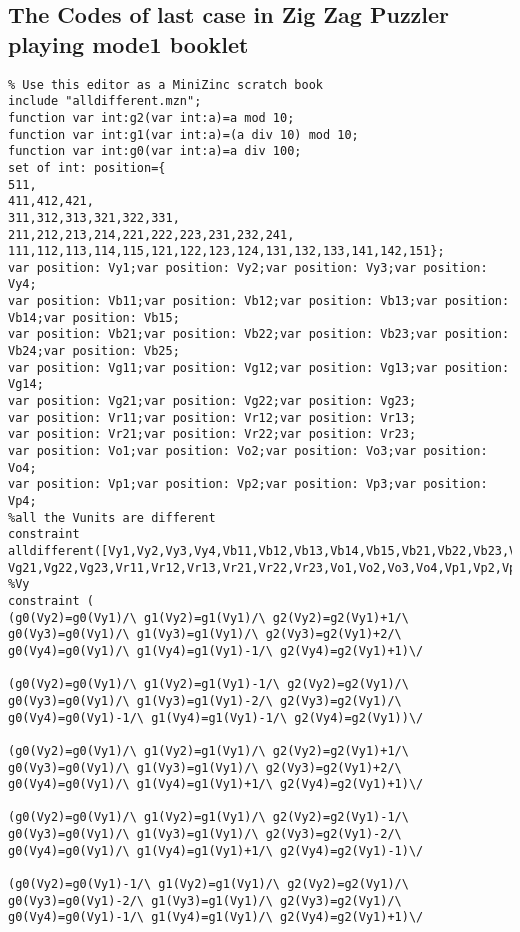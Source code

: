 \begin{appendices}
\section{The Codes of last case in Zig Zag Puzzler playing mode1 booklet}
\label{appendix:lastcaseinmode1}
\begin{lstlisting}
% Use this editor as a MiniZinc scratch book
include "alldifferent.mzn";
function var int:g2(var int:a)=a mod 10;
function var int:g1(var int:a)=(a div 10) mod 10;
function var int:g0(var int:a)=a div 100;
set of int: position={
511,
411,412,421,
311,312,313,321,322,331,
211,212,213,214,221,222,223,231,232,241,
111,112,113,114,115,121,122,123,124,131,132,133,141,142,151};
var position: Vy1;var position: Vy2;var position: Vy3;var position: Vy4;
var position: Vb11;var position: Vb12;var position: Vb13;var position: Vb14;var position: Vb15;
var position: Vb21;var position: Vb22;var position: Vb23;var position: Vb24;var position: Vb25;
var position: Vg11;var position: Vg12;var position: Vg13;var position: Vg14;
var position: Vg21;var position: Vg22;var position: Vg23;
var position: Vr11;var position: Vr12;var position: Vr13;
var position: Vr21;var position: Vr22;var position: Vr23;
var position: Vo1;var position: Vo2;var position: Vo3;var position: Vo4;
var position: Vp1;var position: Vp2;var position: Vp3;var position: Vp4;
%all the Vunits are different
constraint alldifferent([Vy1,Vy2,Vy3,Vy4,Vb11,Vb12,Vb13,Vb14,Vb15,Vb21,Vb22,Vb23,Vb24,Vb25,Vg11,Vg12,Vg13,Vg14,
Vg21,Vg22,Vg23,Vr11,Vr12,Vr13,Vr21,Vr22,Vr23,Vo1,Vo2,Vo3,Vo4,Vp1,Vp2,Vp3,Vp4]);
%Vy
constraint (
(g0(Vy2)=g0(Vy1)/\ g1(Vy2)=g1(Vy1)/\ g2(Vy2)=g2(Vy1)+1/\ g0(Vy3)=g0(Vy1)/\ g1(Vy3)=g1(Vy1)/\ g2(Vy3)=g2(Vy1)+2/\ g0(Vy4)=g0(Vy1)/\ g1(Vy4)=g1(Vy1)-1/\ g2(Vy4)=g2(Vy1)+1)\/ 

(g0(Vy2)=g0(Vy1)/\ g1(Vy2)=g1(Vy1)-1/\ g2(Vy2)=g2(Vy1)/\ g0(Vy3)=g0(Vy1)/\ g1(Vy3)=g1(Vy1)-2/\ g2(Vy3)=g2(Vy1)/\ g0(Vy4)=g0(Vy1)-1/\ g1(Vy4)=g1(Vy1)-1/\ g2(Vy4)=g2(Vy1))\/ 

(g0(Vy2)=g0(Vy1)/\ g1(Vy2)=g1(Vy1)/\ g2(Vy2)=g2(Vy1)+1/\ g0(Vy3)=g0(Vy1)/\ g1(Vy3)=g1(Vy1)/\ g2(Vy3)=g2(Vy1)+2/\ g0(Vy4)=g0(Vy1)/\ g1(Vy4)=g1(Vy1)+1/\ g2(Vy4)=g2(Vy1)+1)\/ 

(g0(Vy2)=g0(Vy1)/\ g1(Vy2)=g1(Vy1)/\ g2(Vy2)=g2(Vy1)-1/\ g0(Vy3)=g0(Vy1)/\ g1(Vy3)=g1(Vy1)/\ g2(Vy3)=g2(Vy1)-2/\ g0(Vy4)=g0(Vy1)/\ g1(Vy4)=g1(Vy1)+1/\ g2(Vy4)=g2(Vy1)-1)\/ 

(g0(Vy2)=g0(Vy1)-1/\ g1(Vy2)=g1(Vy1)/\ g2(Vy2)=g2(Vy1)/\ g0(Vy3)=g0(Vy1)-2/\ g1(Vy3)=g1(Vy1)/\ g2(Vy3)=g2(Vy1)/\ g0(Vy4)=g0(Vy1)-1/\ g1(Vy4)=g1(Vy1)/\ g2(Vy4)=g2(Vy1)+1)\/ 


\end{lstlisting}
\end{appendices}
